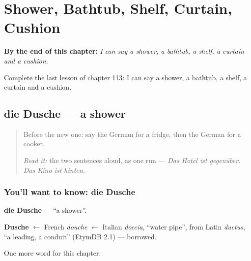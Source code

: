 
\chapter{Shower, Bathtub, Shelf, Curtain, Cushion}
\label{ch:ge-shower-bathtub-shelf-curtain-cushion}

\begin{chapteropening}
\textbf{By the end of this chapter:} \emph{I can say a shower, a bathtub, a shelf, a curtain and a cushion.}

Complete the last lesson of chapter 113: I can say a shower, a bathtub, a shelf, a curtain and a cushion.
\end{chapteropening}

\section[die Dusche]{die Dusche — a shower}

\label{lesson:GE-C113-dusche}



\begin{quote}
Before the new one: say the German for a fridge, then the German for a cooker.

\emph{Read it:} the two sentences aloud, as one run — \emph{Das Hotel ist gegenüber. Das Kino ist hinten.}
\end{quote}

\subsection*{You'll want to know: die Dusche}
\textbf{die Dusche} — \textquotedblleft{}a shower\textquotedblright{}.

\begin{cousinweb}
\textbf{Dusche} $\leftarrow$ French \emph{douche} $\leftarrow$ Italian \emph{doccia}, \textquotedblleft{}water pipe\textquotedblright{}, from Latin \emph{ductus}, \textquotedblleft{}a leading, a conduit\textquotedblright{} (EtymDB 2.1) — borrowed.
\end{cousinweb}

\begin{grammarlens}[title={What you've built}]
One more word for this chapter.
\end{grammarlens}

